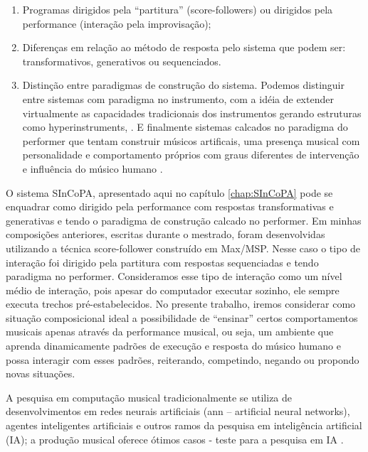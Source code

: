 \documentclass{ppgmus}
\begin{document}
\begin{enumerate}
\item Programas dirigidos pela ``partitura'' (score-followers) ou
  dirigidos pela performance (interação pela improvisação);
\item Diferenças em relação ao método de resposta pelo sistema que
  podem ser: transformativos, generativos ou sequenciados.
\item Distinção entre paradigmas de construção do sistema. Podemos
  distinguir entre sistemas com paradigma no instrumento, com a idéia
  de extender virtualmente as capacidades tradicionais dos
  instrumentos gerando estruturas como hyperinstruments, \cite{hyperinstrumento}. 
  E finalmente sistemas calcados no paradigma do
  performer que tentam construir músicos artificais, uma presença
  musical com personalidade e comportamento próprios com graus
  diferentes de intervenção e influência do músico humano \cite{rowe93:interactive}.
\end{enumerate}


O sistema SInCoPA, apresentado aqui no capítulo \ref{chap:SInCoPA} pode se enquadrar como dirigido pela
performance com respostas transformativas e generativas e tendo o
paradigma de construção calcado no performer. Em minhas composições
anteriores, escritas durante o mestrado, foram
desenvolvidas utilizando a técnica score-follower construído em
Max/MSP. Nesse caso o tipo de interação foi dirigido pela partitura
com respostas sequenciadas e tendo paradigma no performer.
Consideramos esse tipo de interação como um nível médio de interação,
pois apesar do computador executar sozinho, ele sempre executa trechos
pré-estabelecidos. No presente trabalho, iremos considerar como
situação composicional ideal a possibilidade de “ensinar” certos
comportamentos musicais apenas através da performance musical, ou
seja, um ambiente que aprenda dinamicamente padrões de execução e
resposta do músico humano e possa interagir com esses padrões,
reiterando, competindo, negando ou propondo novas situações.


A pesquisa em computação musical tradicionalmente se utiliza de
desenvolvimentos em redes neurais artificiais (ann – artificial neural
networks), agentes inteligentes artificiais e outros ramos da pesquisa
em inteligência artificial (IA); a produção musical oferece ótimos
casos - teste para a pesquisa em IA \cite{rowe2004machine}. 

\end{document}
